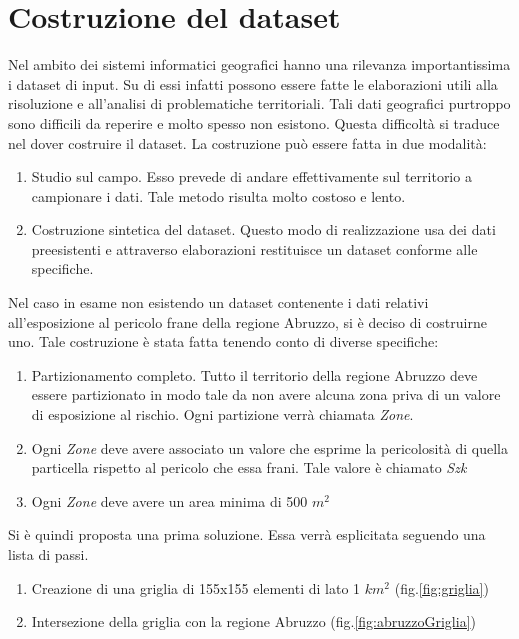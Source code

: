 
\chapter{Costruzione del dataset}
Nel ambito dei sistemi informatici geografici hanno una rilevanza importantissima i dataset di input. Su di essi infatti possono essere fatte le elaborazioni utili alla risoluzione e all'analisi di problematiche territoriali. Tali dati geografici purtroppo sono difficili da reperire e molto spesso non esistono. Questa difficoltà si traduce nel dover costruire il dataset. La costruzione può essere fatta in due modalità:
\begin{enumerate}
	\item Studio sul campo. Esso prevede di andare effettivamente sul territorio a campionare i dati. Tale metodo risulta molto costoso e lento.
	\item Costruzione sintetica del dataset. Questo modo di realizzazione usa dei dati preesistenti e attraverso elaborazioni restituisce un dataset conforme alle specifiche.
\end{enumerate}
Nel caso in esame non esistendo un dataset contenente i dati relativi all'esposizione al pericolo frane della regione Abruzzo, si è deciso di costruirne uno. Tale costruzione è stata fatta tenendo conto di diverse specifiche:
\begin{enumerate}
	\item Partizionamento completo. Tutto il territorio della regione Abruzzo deve essere partizionato in modo tale da non avere alcuna zona priva di un valore di esposizione al rischio. Ogni partizione verrà chiamata \textit{Zone}.
	\item Ogni \textit{Zone} deve avere associato un valore che esprime la pericolosità di quella particella rispetto al pericolo che essa frani. Tale valore è chiamato \textit{Szk}
	\item Ogni \textit{Zone} deve avere un area minima di 500 $m^2$
\end{enumerate}
Si è quindi proposta una prima soluzione. Essa verrà esplicitata seguendo una lista di passi.
\begin{enumerate}
	\item Creazione di una griglia di 155x155 elementi di lato 1 $km^2$ (fig.\ref{fig:griglia})
	\item Intersezione della griglia con la regione Abruzzo (fig.\ref{fig:abruzzoGriglia})
\end{enumerate}

